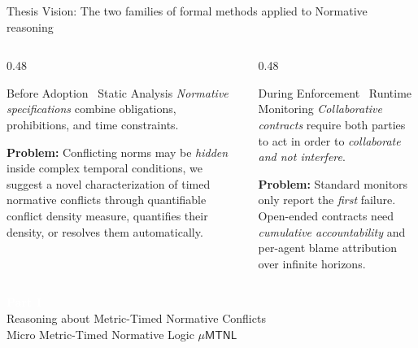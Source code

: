 \documentclass[9pt,aspectratio=169]{beamer}
\newcommand{\logic}[1]{\ensuremath{\mathsf{#1}}\xspace}
\newcommand{\TDDLfm}{\logic{\mu MTNL}}
\begin{document}
\begin{frame}{Thesis Vision: The two families of formal methods applied to Normative reasoning}

\centering
{}
\vspace{4mm}
\begin{columns}[T]
  \begin{column}{0.48\textwidth}
    \begin{block}{\textcolor{ConflictBlue}{Before Adoption \textemdash\ Static Analysis}}
      \small
      \emph{Normative specifications} combine obligations, prohibitions, and time constraints.\medskip

      \textbf{Problem:}  Conflicting norms may be \emph{hidden} inside complex temporal conditions, we suggest a novel characterization of timed normative conflicts through quantifiable conflict density measure,  quantifies their density, or resolves them automatically.
    \end{block}
  \end{column}
  \begin{column}{0.48\textwidth}
    \begin{block}{\textcolor{ConflictGreen}{During Enforcement \textemdash\ Runtime Monitoring}}
      \small
      \emph{Collaborative contracts} require both parties to act in order to \emph{collaborate and not interfere}.\medskip

      \textbf{Problem:}  Standard monitors only report the \emph{first} failure.
      Open-ended contracts need \emph{cumulative accountability} and per-agent blame attribution over infinite horizons.
    \end{block}
  \end{column}
\end{columns}
\end{frame}

{
\begin{frame}[plain]
  \vfill
  \centering
  \textcolor{white}{\Huge\bfseries Part I}\\[6mm]
  \textcolor{white!85}{\Large Reasoning about Metric-Timed Normative Conflicts }\\[3mm]
  \textcolor{white!70}{\large Micro Metric-Timed Normative Logic $\TDDLfm$}
  \vfill
\end{frame}
}
\end{document}
